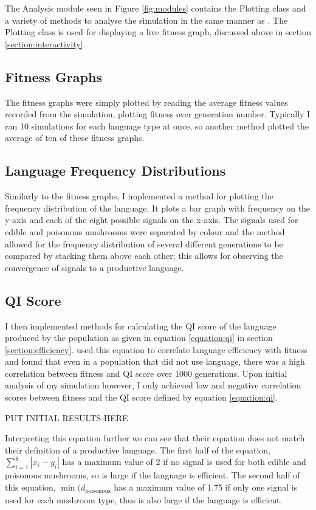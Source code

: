 \documentclass[12pt,a4paper,twoside,openright]{report}
\begin{document}
The Analysis module seen in Figure \ref{fig:modules} contains the Plotting class and a variety of methods to analyse the simulation in the same manner as \citet{Cangelosi1998}. The Plotting class is used for displaying a live fitness graph, discussed above in section \ref{section:interactivity}.

\subsection{Fitness Graphs}

The fitness graphs were simply plotted by reading the average fitness values recorded from the simulation, plotting fitness over generation number. Typically I ran 10 simulations for each language type at once, so another method plotted the average of ten of these fitness graphs.

\subsection{Language Frequency Distributions}

Similarly to the fitness graphs, I implemented a method for plotting the frequency distribution of the language. It plots a bar graph with frequency on the y-axis and each of the eight possible signals on the x-axis. The signals used for edible and poisonous mushrooms were separated by colour and the method allowed for the frequency distribution of several different generations to be compared by stacking them above each other; this allows for observing the convergence of signals to a productive language.

\subsection{QI Score}

I then implemented methods for calculating the QI score of the language produced by the population as given in equation \ref{equation:qi} in section \ref{section:efficiency}. \citet{Cangelosi1998} used this equation to correlate language efficiency with fitness and found that even in a population that did not use language, there was a high correlation between fitness and QI score over 1000 generations. Upon initial analysis of my simulation however, I only achieved low and negative correlation scores between fitness and the QI score defined by equation \ref{equation:qi}. 

PUT INITIAL RESULTS HERE

Interpreting this equation further we can see that their equation does not match their definition of a productive language. The first half of the equation, $\sum^{8}_{i = 1} |x_i - y_i|$ has a maximum value of 2 if no signal is used for both edible and poisonous mushrooms, so is large if the language is efficient. The second half of this equation, $\min (d_{\mathrm{poisonous}}$ has a maximum value of 1.75 if only one signal is used for each mushroom type, thus is also large if the language is efficient. 
\end{document}

